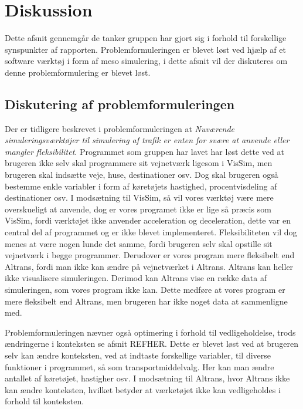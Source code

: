 \chapter{Diskussion}
Dette afsnit gennemgår de tanker gruppen har gjort sig i forhold til forskellige synspunkter af rapporten. Problemformuleringen er blevet løst ved hjælp af et software værktøj i form af meso simulering, i dette afsnit vil der diskuteres om denne problemformulering er blevet løst. 

\vspace{5mm}

\section{Diskutering af problemformuleringen}
Der er tidligere beskrevet i problemformuleringen at \textit{Nuværende simuleringsværktøjer til simulering af trafik er enten for svære at anvende eller mangler fleksibilitet}. Programmet som gruppen har lavet har løst dette ved at brugeren ikke selv skal programmere sit vejnetværk ligesom i VisSim, men brugeren skal indsætte veje, huse, destinationer osv. Dog skal brugeren også bestemme enkle variabler i form af køretøjets hastighed, procentvisdeling af destinationer osv. I modsætning til VisSim, så vil vores værktøj være mere overskueligt at anvende, dog er vores programet ikke er lige så præcis som VisSim, fordi værktøjet ikke anvender acceleration og deceleration, dette var en central del af programmet og er ikke blevet implementeret. Fleksibiliteten vil dog menes at være nogen lunde det samme, fordi brugeren selv skal opstille sit vejnetværk i begge programmer. Derudover er vores program mere fleksibelt end Altrans, fordi man ikke kan ændre på vejnetværket i Altrans. Altrans kan heller ikke visualisere simuleringen. Derimod kan Altrans vise en række data af simuleringen, som vores program ikke kan. Dette medføre at vores program er mere fleksibelt end Altrans, men brugeren har ikke noget data at sammenligne med.

\vspace{5mm}

Problemformuleringen nævner også optimering i forhold til vedligeholdelse, trods ændringerne i konteksten se afsnit REFHER. Dette er blevet løst ved at brugeren selv kan ændre konteksten, ved at indtaste forskellige variabler, til diverse funktioner i programmet, så som transportmiddelvalg. Her kan man ændre antallet af køretøjet, hastigher osv. I modsætning til Altrans, hvor Altrans ikke kan ændre konteksten, hvilket betyder at værketøjet ikke kan vedligeholdes i forhold til konteksten.


